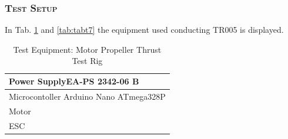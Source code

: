 \subsubsection*{\textsc{\medium Test Setup}}
In Tab. \ref{tab:tabt6} and \ref{tab:tabt7} the equipment used conducting TR005 is displayed.
\begin {table}[H]
    \begin{center}
    \caption {Test Equipment: Motor Propeller Thrust Test Rig} 
    \label{tab:tabt6} 
    \begin{tabular}{|l|}\hline 
        Power SupplyEA-PS 2342-06 B           \\ \hline
        Microcontoller Arduino Nano ATmega328P \\ \hline
        Motor \\ \hline
        ESC\\ \hline    
        \end{tabular}
    \end{center}
\end{table}

